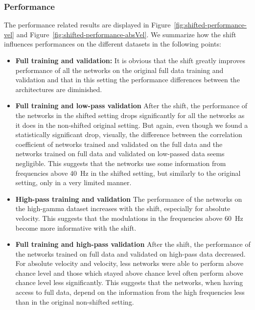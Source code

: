 \subsubsection{Performance}
The performance related results are displayed in Figure~\ref{fig:shifted-performance-vel} and Figure~\ref{fig:shifted-performance-absVel}.
We summarize how the shift influences performances on the different datasets in the following points:
\begin{itemize}
    \item \textbf{Full training and validation:} It is obvious that the shift greatly improves performance of all the networks on the original full data training and validation and that in this setting the performance differences between the architectures are diminished.
    
    
    \item \textbf{Full training and low-pass validation} After the shift, the performance of the networks in the shifted setting drops significantly for all the networks as it does in the non-shifted original setting. But again, even though we found a statistically significant drop, visually, the difference between the correlation coefficient of networks trained and validated on the full data and the networks trained on full data and validated on low-passed data seems negligible. This suggests that the networks use some information from frequencies above 40~Hz in the shifted setting, but similarly to the original setting, only in a very limited manner.
    
    \item \textbf{High-pass training and validation} The performance of the networks on the high-gamma dataset increases with the shift, especially for absolute velocity. This suggests that the modulations in the frequencies above 60~Hz become more informative with the shift.
    
    \item \textbf{Full training and high-pass validation} After the shift, the performance of the networks trained on full data and validated on high-pass data decreased. For absolute velocity and velocity, less networks were able to perform above chance level and those which stayed above chance level often perform above chance level less significantly. This suggests that the networks, when having access to full data, depend on the information from the high frequencies less than in the original non-shifted setting.

\end{itemize}


